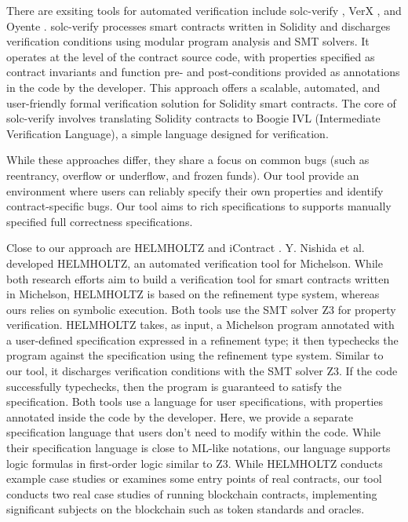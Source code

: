 \documentclass[a4paper,USenglish,cleveref, autoref,anonymous]{lipics-v2021}
\begin{document}
There are exsiting tools for automated verification include solc-verify \cite{solc}, VerX \cite{verx}, and Oyente \cite{oyente}. solc-verify processes smart contracts written in Solidity and discharges verification conditions using modular program analysis and SMT solvers. It operates at the level of the contract source code, with properties specified as contract invariants and function pre- and post-conditions provided as annotations in the code by the developer. This approach offers a scalable, automated, and user-friendly formal verification solution for Solidity smart contracts. The core of solc-verify involves translating Solidity contracts to Boogie IVL (Intermediate Verification Language), a simple language designed for verification. 

While these approaches differ, they share a focus on common bugs (such as reentrancy, overflow or underflow, and frozen funds). Our tool provide an environment where users can reliably specify their own properties and identify contract-specific bugs. Our tool aims to rich specifications to supports manually specified full correctness specifications.


Close to our approach are HELMHOLTZ \cite{helmholtz} and iContract \cite{icontract}. Y. Nishida et al. \cite{helmholtz} developed HELMHOLTZ, an automated verification tool for Michelson. While both research efforts aim to build a verification tool for smart contracts written in Michelson, HELMHOLTZ is based on the refinement type system, whereas ours relies on symbolic execution. Both tools use the SMT solver Z3 for property verification. HELMHOLTZ takes, as input, a Michelson program annotated with a user-defined specification expressed in a refinement type; it then typechecks the program against the specification using the refinement type system. Similar to our tool, it discharges verification conditions with the SMT solver Z3. If the code successfully typechecks, then the program is guaranteed to satisfy the specification. Both tools use a language for user specifications, with properties annotated inside the code by the developer. Here, we provide a separate specification language that users don't need to modify within the code. While their specification language is close to ML-like notations, our language supports logic formulas in first-order logic similar to Z3. While HELMHOLTZ conducts example case studies or examines some entry points of real contracts, our tool conducts two real case studies of running blockchain contracts, implementing significant subjects on the blockchain such as token standards and oracles.
\end{document}
